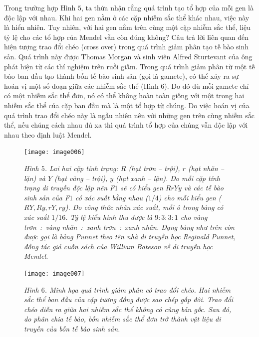 \begin{multicols}{2}
\begin{figure}[H]
		\vspace*{-10pt}
	\end{figure}
	Trong trường hợp Hình $5$, ta thừa nhận rằng quá trình tạo tổ hợp của mỗi gen là độc lập với nhau. Khi hai gen nằm ở các cặp nhiễm sắc thể khác nhau, việc này là hiển nhiên. Tuy nhiên, với hai gen nằm trên cùng một cặp nhiễm sắc thể, liệu tỷ lệ cho các tổ hợp của Mendel vẫn còn đúng không?
	\vskip 0.1cm
	Câu trả lời liên quan đến hiện tượng trao đổi chéo (cross over) trong quá trình giảm phân tạo tế bào sinh sản. Quá trình này được Thomas Morgan và sinh viên Alfred Sturtevant của ông phát hiện từ các thí nghiệm trên ruồi giấm. Trong quá trình giảm phân từ một tế bào ban đầu tạo thành bốn tế bào sinh sản (gọi là gamete), có thể xảy ra sự hoán vị một số đoạn giữa các nhiễm sắc thể (Hình $6$). Do đó dù mỗi gamete chỉ có một nhiễm sắc thể đơn, nó có thể không hoàn toàn giống với một trong hai nhiễm sắc thể của cặp ban đầu mà là một tổ hợp từ chúng. Do việc hoán vị của quá trình trao đổi chéo này là ngẫu nhiên nên với những gen trên cùng nhiễm sắc thể, nếu chúng cách nhau đủ xa thì quá trình tổ hợp của chúng vẫn độc lập với nhau theo định luật Mendel.  
	\begin{figure}[H]
		\centering
		\vspace*{-5pt}
		\captionsetup{labelformat= empty, justification=centering}
		\texttt{[image: image006]}
		\caption{\small\textit{\color{timhieukhoahoc}Hình $5$. Lai hai cặp tính trạng: $R$ (hạt trơn -- trội), $r$ (hạt nhăn -- lặn) và $Y$ (hạt vàng -- trội), $y$ (hạt xanh -- lặn). Do mỗi cặp tính trạng di truyền độc lập nên F$1$ sẽ có kiểu gen $RrYy$ và các tế bào sinh sản của F$1$ có xác suất bằng nhau ($1/4$) cho mỗi kiểu gen ($RY, Ry, rY, ry$). Do công thức nhân xác suất, mỗi ô trong bảng có xác suất $1/16$. Tỷ lệ kiểu hình thu được là $9 : 3 : 3 : 1$ cho vàng trơn~:~vàng nhăn~:~xanh trơn~:~xanh nhăn. Dạng bảng như trên còn được gọi là bảng Punnet theo tên nhà di truyền học Reginald Punnet, đồng tác giả cuốn sách của William Bateson về di truyền học Mendel.}}
		\vspace*{-5pt}
	\end{figure}
	\begin{figure}[H]
		\centering
		\captionsetup{labelformat= empty, justification=centering}
		\texttt{[image: image007]}
		\caption{\small\textit{\color{timhieukhoahoc}Hình $6$. Minh họa quá trình giảm phân có trao đổi chéo. Hai nhiễm sắc thể ban đầu của cặp tương đồng được sao chép gấp đôi. Trao đổi chéo diễn ra giữa hai nhiễm sắc thể không có cùng bản gốc. Sau đó, do phân chia tế bào, bốn nhiễm sắc thể đơn trở thành vật liệu di truyền của bốn tế bào sinh sản.}}

\end{figure}
\end{multicols}
